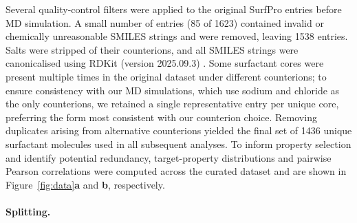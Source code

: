 \documentclass[letterpaper]{article}
\begin{document}
Several quality-control filters were applied to the original SurfPro entries before MD simulation. A small number of entries (85 of 1623) contained invalid or chemically unreasonable SMILES strings and were removed, leaving 1538 entries. Salts were stripped of their counterions, and all SMILES strings were canonicalised using RDKit (version 2025.09.3) \cite{landrum2006rdkit}. Some surfactant cores were present multiple times in the original dataset under different counterions; to ensure consistency with our MD simulations, which use sodium and chloride as the only counterions, we retained a single representative entry per unique core, preferring the form most consistent with our counterion choice. Removing duplicates arising from alternative counterions yielded the final set of 1436 unique surfactant molecules used in all subsequent analyses.
To inform property selection and identify potential redundancy, target-property distributions and pairwise Pearson correlations were computed across the curated dataset and are shown in Figure~\ref{fig:data}\textbf{a} and \textbf{b}, respectively.

% 
% 


\paragraph{Splitting.}
\end{document}
